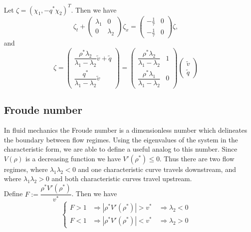 \documentclass[review]{elsarticle}
\begin{document}
Let $\zeta = (\chi_1, -q^*\chi_2)^T$. Then we have
\begin{equation} \label{vqlindiag}
\zeta_t + \begin{pmatrix}
\lambda_1 & 0 \\
0 & \lambda_2
\end{pmatrix} \zeta_x = \begin{pmatrix}
-\frac{1}{\tau} & 0 \\
-\frac{1}{\tau} & 0
\end{pmatrix} \zeta,
\end{equation}
and
\begin{equation} \label{eq:Riemannzeta}
\zeta = \begin{pmatrix}
\dfrac{\rho^*\lambda_2}{\lambda_1 - \lambda_2}\tilde{v} + \tilde{q} \\ 
\dfrac{q^*}{\lambda_1 - \lambda_2}\tilde{v} 
\end{pmatrix} = 
\begin{pmatrix}
\dfrac{\rho^*\lambda_2}{\lambda_1-\lambda_2} & 1\\
\dfrac{\rho^*\lambda_1}{\lambda_1-\lambda_2} & 0
\end{pmatrix} \begin{pmatrix}
\tilde{v} \\ \tilde{q} 
\end{pmatrix}
\end{equation}

\subsection{Froude number}
In fluid mechanics the Froude number is a dimensionless number which delineates the boundary between flow regimes. Using the eigenvalues of the system in the characteristic form, we are able to define a useful analog to this number.
Since $V(\rho)$ is a decreasing function we have $V'(\rho^*) \leq 0$. Thus there are two flow regimes, where $\lambda_1 \lambda_2 < 0$ and one characteristic curve travels downstream, and where $\lambda_1 \lambda_2 > 0$ and both characteristic curves travel upstream. \\
Define $F := \dfrac{\rho^*V'( \rho^*)}{v^*}$. Then we have
\begin{equation*}
\begin{cases}
F > 1 &\Rightarrow |\rho^*V'(\rho^*)| > v^* \quad \Rightarrow \lambda_2  <0 \\
F < 1 &\Rightarrow |\rho^*V'(\rho^*)| < v^* \quad \Rightarrow \lambda_2 > 0
\end{cases}
\end{equation*}
\end{document}
